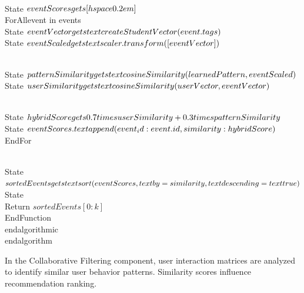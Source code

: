     \\State $eventScores \\gets [\\hspace{0.2em}]$
    \\ForAll{event in events}
        \\State $eventVector \\gets \\text{createStudentVector}(event.tags)$
        \\State $eventScaled \\gets \\text{scaler.transform}([eventVector])$
        
        \\State $patternSimilarity \\gets \\text{cosineSimilarity}(learnedPattern, eventScaled)$
        \\State $userSimilarity \\gets \\text{cosineSimilarity}(userVector, eventVector)$
        
        \\State $hybridScore \\gets 0.7 \\times userSimilarity + 0.3 \\times patternSimilarity$
        \\State $eventScores.\\text{append}(\\{event\\_id: event.id, similarity: hybridScore\\})$
    \\EndFor
    
    \\State $sortedEvents \\gets \\text{sort}(eventScores, \\text{by}=similarity, \\text{descending}=\\text{true})$
    \\State \\Return $sortedEvents[0:k]$
\\EndFunction
\\end{algorithmic}
\\end{algorithm}

In the Collaborative Filtering component, user interaction matrices are analyzed to identify similar user behavior patterns. Similarity scores influence recommendation ranking.


